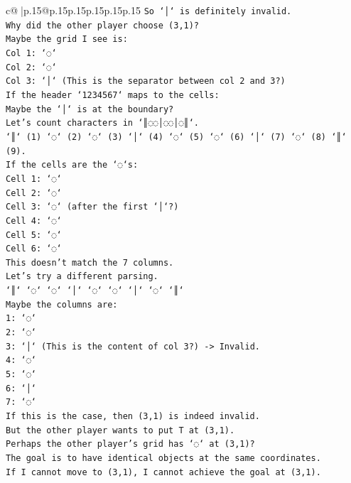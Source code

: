 \documentclass{article}
\begin{document}
{\begin{supertabular}{c@{$\;$}|p{.15\linewidth}@{}p{.15\linewidth}p{.15\linewidth}p{.15\linewidth}p{.15\linewidth}p{.15\linewidth}}
{{{\texttt{So `│` is definitely invalid.} \\
\texttt{Why did the other player choose (3,1)?} \\
\texttt{Maybe the grid I see is:} \\
\texttt{Col 1: `◌`} \\
\texttt{Col 2: `◌`} \\
\texttt{Col 3: `│` (This is the separator between col 2 and 3?)} \\
\texttt{If the header `1234567` maps to the cells:} \\
\texttt{Maybe the `│` is at the boundary?} \\
\texttt{Let's count characters in `║◌◌│◌◌│◌║`.} \\
\texttt{`║` (1) `◌` (2) `◌` (3) `│` (4) `◌` (5) `◌` (6) `│` (7) `◌` (8) `║` (9).} \\
\texttt{If the cells are the `◌`s:} \\
\texttt{Cell 1: `◌`} \\
\texttt{Cell 2: `◌`} \\
\texttt{Cell 3: `◌` (after the first `│`?)} \\
\texttt{Cell 4: `◌`} \\
\texttt{Cell 5: `◌`} \\
\texttt{Cell 6: `◌`} \\
\texttt{This doesn't match the 7 columns.} \\
\texttt{Let's try a different parsing.} \\
\texttt{`║` `◌` `◌` `│` `◌` `◌` `│` `◌` `║`} \\
\texttt{Maybe the columns are:} \\
\texttt{1: `◌`} \\
\texttt{2: `◌`} \\
\texttt{3: `│` (This is the content of col 3?) {-}> Invalid.} \\
\texttt{4: `◌`} \\
\texttt{5: `◌`} \\
\texttt{6: `│`} \\
\texttt{7: `◌`} \\
\texttt{If this is the case, then (3,1) is indeed invalid.} \\
\texttt{But the other player wants to put T at (3,1).} \\
\texttt{Perhaps the other player's grid has `◌` at (3,1)?} \\
\texttt{The goal is to have identical objects at the same coordinates.} \\
\texttt{If I cannot move to (3,1), I cannot achieve the goal at (3,1).} \\
}}}
\end{supertabular}}
\end{document}
